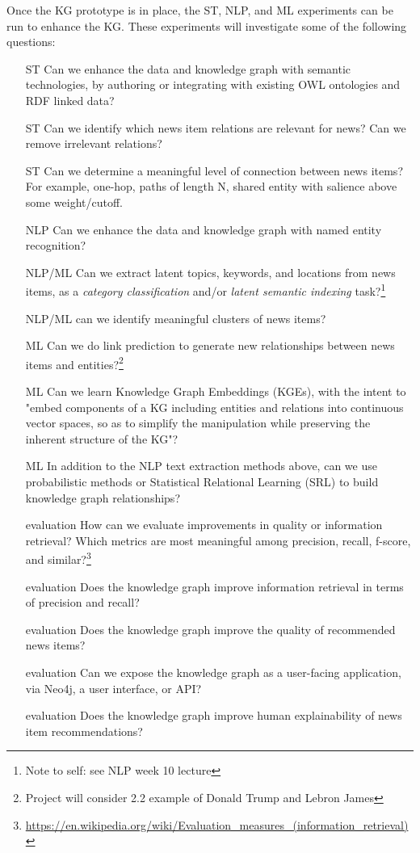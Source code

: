 \documentclass[11pt]{article}   	%
\begin{document}
Once the KG prototype is in place, the ST, NLP, and ML experiments can be run to enhance the KG. These experiments will investigate some of the following questions:
\begin{itemize}
\item [ST] Can we enhance the data and knowledge graph with semantic technologies, by authoring or integrating with existing OWL ontologies and RDF linked data?
\item [ST] Can we identify which news item relations are relevant for news? Can we remove irrelevant relations?
\item [ST] Can we determine a meaningful level of connection between news items? For example, one-hop, paths of length N, shared entity with salience above some weight/cutoff.
\item [NLP] Can we enhance the data and knowledge graph with named entity recognition?
\item [NLP/ML] Can we extract latent topics, keywords, and locations from news items, as a \textit{category classification} and/or \textit{latent semantic indexing} task?\footnote{Note to self: see NLP week 10 lecture}
\item [NLP/ML] can we identify meaningful clusters of news items?
\item [ML] Can we do link prediction to generate new relationships between news items and entities?\footnote{Project will consider 2.2 example of Donald Trump and Lebron James\cite{liu2019news}}
\item [ML] Can we learn Knowledge Graph Embeddings (KGEs), with the intent to "embed components of a KG including entities and relations into continuous vector spaces, so as to simplify the manipulation while preserving the inherent structure of the KG"?\cite{wang2017knowledge}
\item [ML] In addition to the NLP text extraction methods above, can we use probabilistic methods\cite{45634} or Statistical Relational Learning (SRL)\cite{nickel2015review} to build knowledge graph relationships?
\item [evaluation] How can we evaluate improvements in quality or information retrieval? Which metrics are most meaningful among precision, recall, f-score, and similar?\footnote{
\url{https://en.wikipedia.org/wiki/Evaluation_measures_(information_retrieval)}}
\item [evaluation] Does the knowledge graph improve information retrieval in terms of precision and recall?
\item [evaluation] Does the knowledge graph improve the quality of recommended news items?
\item [evaluation] Can we expose the knowledge graph as a user-facing application, via Neo4j, a user interface, or API?
\item [evaluation] Does the knowledge graph improve human explainability of news item recommendations?
\end{itemize}
\end{document}
